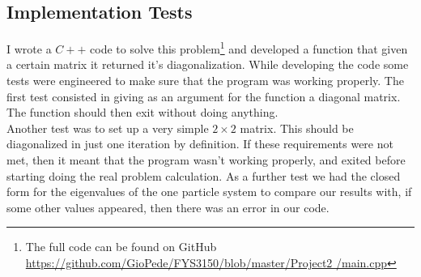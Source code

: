 \documentclass[10pt,a4paper,titlepage]{article}
\begin{document}
\subsection*{Implementation Tests}
I wrote a $C++$ code to solve this problem\footnote{The full code can be found on GitHub \url{https://github.com/GioPede/FYS3150/blob/master/Project2
/main.cpp}} and developed a function that given a certain matrix it returned it's diagonalization. While developing the code some tests were engineered 
to make sure that the program was working properly. The first test consisted in giving as an argument for the function a diagonal matrix. The function 
should then exit without doing anything. \\
Another test was to set up a very simple  $2\times 2$ matrix. This should be diagonalized in just one iteration by definition. If these requirements 
were not met, then it meant that the program wasn't working properly, and exited before starting doing the real problem calculation.
As a further test we had the closed form for the eigenvalues of the one particle system to compare our results with, if some other values appeared, then
there was an error in our code.
\end{document}
